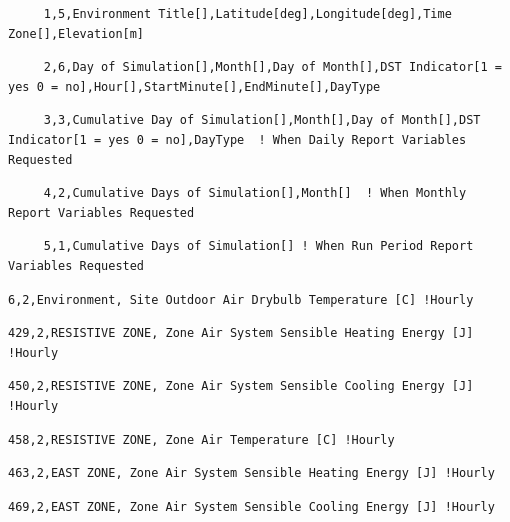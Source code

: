 \begin{lstlisting}
     1,5,Environment Title[],Latitude[deg],Longitude[deg],Time Zone[],Elevation[m]
\end{lstlisting}

\begin{lstlisting}
     2,6,Day of Simulation[],Month[],Day of Month[],DST Indicator[1 = yes 0 = no],Hour[],StartMinute[],EndMinute[],DayType
\end{lstlisting}

\begin{lstlisting}
     3,3,Cumulative Day of Simulation[],Month[],Day of Month[],DST Indicator[1 = yes 0 = no],DayType  ! When Daily Report Variables Requested
\end{lstlisting}

\begin{lstlisting}
     4,2,Cumulative Days of Simulation[],Month[]  ! When Monthly Report Variables Requested
\end{lstlisting}

\begin{lstlisting}
     5,1,Cumulative Days of Simulation[] ! When Run Period Report Variables Requested
\end{lstlisting}

\begin{lstlisting}
6,2,Environment, Site Outdoor Air Drybulb Temperature [C] !Hourly
\end{lstlisting}

\begin{lstlisting}
429,2,RESISTIVE ZONE, Zone Air System Sensible Heating Energy [J] !Hourly
\end{lstlisting}

\begin{lstlisting}
450,2,RESISTIVE ZONE, Zone Air System Sensible Cooling Energy [J] !Hourly
\end{lstlisting}

\begin{lstlisting}
458,2,RESISTIVE ZONE, Zone Air Temperature [C] !Hourly
\end{lstlisting}

\begin{lstlisting}
463,2,EAST ZONE, Zone Air System Sensible Heating Energy [J] !Hourly
\end{lstlisting}

\begin{lstlisting}
469,2,EAST ZONE, Zone Air System Sensible Cooling Energy [J] !Hourly
\end{lstlisting}

